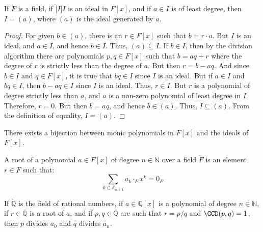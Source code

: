\documentclass{article}                                                        %
\begin{document}
        \begin{theorem}
            If $\ring{F}$ is a field, if $\ring[I]{I}$ is an ideal in $F[x]$,
            and if $a\in{I}$ is of least degree, then $I=(a)$, where $(a)$ is
            the ideal generated by $a$.
        \end{theorem}
        \begin{proof}
            For given $b\in(a)$, there is an $r\in{F}[x]$ such that
            $b=r\cdot{a}$. But $I$ is an ideal, and $a\in{I}$, and hence
            $b\in{I}$. Thus, $(a)\subseteq{I}$. If $b\in{I}$, then by the
            division algorithm there are polynomials $p,q\in{F}[x]$ such that
            $b=aq+r$ where the degree of $r$ is strictly less than the degree of
            $a$. But then $r=b-aq$. And since $b\in{I}$ and $q\in{F}[x]$, it is
            true that $bq\in{I}$ since $I$ is an ideal. But if $a\in{I}$ and
            $bq\in{I}$, then $b-aq\in{I}$ since $I$ is an ideal. Thus,
            $r\in{I}$. But $r$ is a polynomial of degree strictly less than
            $a$, and $a$ is a non-zero polynomial of least degree in $I$.
            Therefore, $r=0$. But then $b=aq$, and hence $b\in(a)$. Thus,
            $I\subseteq(a)$. From the definition of equality, $I=(a)$.
        \end{proof}
        \begin{theorem}
            There exists a bijection between monic polynomials in $F[x]$ and
            the ideals of $F[x]$.
        \end{theorem}
        \begin{definition}
            A root of a polynomial $a\in{F}[x]$ of degree $n\in\mathbb{N}$ over
            a field $\ring{F}$ is an element $r\in{F}$ such that:
            \begin{equation}
                \sum_{k\in\mathbb{Z}_{n+1}}a_{k}\cdot_{F}x^{k}=0_{F}
            \end{equation}
        \end{definition}
        \begin{theorem}
            If $\ring{\mathbb{Q}}$ is the field of rational numbers, if
            $a\in\mathbb{Q}[x]$ is a polynomial of degree $n\in\mathbb{N}$,
            if $r\in\mathbb{Q}$ is a root of $a$, and if $p,q\in\mathbb{Q}$
            are such that $r=p/q$ and $\GCD(p,q)=1$, then $p$ divides $a_{0}$
            and $q$ divides $a_{n}$.
        \end{theorem}
\end{document}
